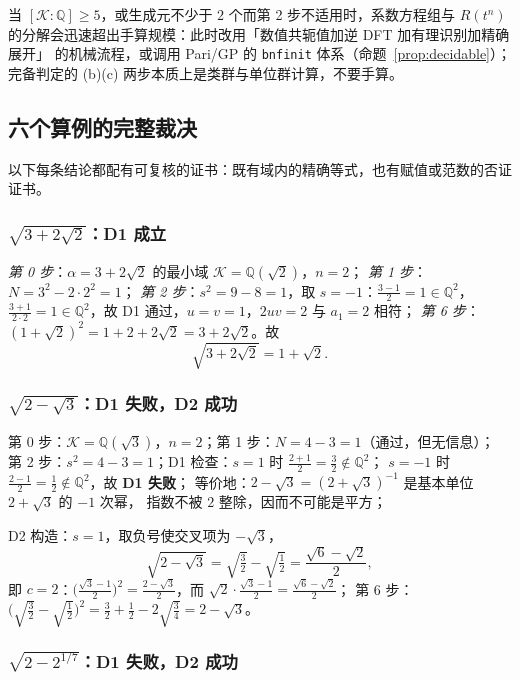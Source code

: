 \documentclass[UTF8,a4paper,11pt]{ctexart}
\begin{document}
当 $[\mathscr{K}:\mathbb{Q}]\ge5$，或生成元不少于 $2$ 个而第 2 步不适用时，系数方程组与
$R(t^n)$ 的分解会迅速超出手算规模：此时改用「数值共轭值加逆 DFT 加有理识别加精确展开」
的机械流程，或调用 Pari/GP 的 \texttt{bnfinit} 体系（命题~\ref{prop:decidable}）；
完备判定的 (b)(c) 两步本质上是类群与单位群计算，不要手算。
\subsection{六个算例的完整裁决}
\label{sec:examples}

以下每条结论都配有可复核的证书：既有域内的精确等式，也有赋值或范数的否证证书。\par

\subsubsection{$\sqrt{3+2\sqrt2}$：D1 成立}
\label{ex:first}

\emph{第 0 步}：$\alpha=3+2\sqrt2$ 的最小域 $\mathscr{K}=\mathbb{Q}(\sqrt2)$，$n=2$；
\emph{第 1 步}：$N=3^2-2\cdot2^2=1$；
\emph{第 2 步}：$s^2=9-8=1$，取 $s=-1$：$\tfrac{3-1}2=1\in\mathbb{Q}^2$，
$\tfrac{3+1}{2\cdot2}=1\in\mathbb{Q}^2$，故 D1 通过，$u=v=1$，$2uv=2$ 与 $a_1=2$ 相符；
\emph{第 6 步}：$(1+\sqrt2)^2=1+2+2\sqrt2=3+2\sqrt2$。故
\[
\sqrt{3+2\sqrt2}=1+\sqrt2 .
\]

\subsubsection{$\sqrt{2-\sqrt3}$：D1 失败，D2 成功}
\label{ex:two-sqrt3}

第 0 步：$\mathscr{K}=\mathbb{Q}(\sqrt3)$，$n=2$；第 1 步：$N=4-3=1$（通过，但无信息）；
第 2 步：$s^2=4-3=1$；D1 检查：$s=1$ 时 $\tfrac{2+1}2=\tfrac32\notin\mathbb{Q}^2$；
$s=-1$ 时 $\tfrac{2-1}2=\tfrac12\notin\mathbb{Q}^2$，故 \textbf{D1 失败}；
等价地：$2-\sqrt3=(2+\sqrt3)^{-1}$ 是基本单位 $2+\sqrt3$ 的 $-1$ 次幂，
指数不被 $2$ 整除，因而不可能是平方；\par

D2 构造：$s=1$，取负号使交叉项为 $-\sqrt3$，
\[
\sqrt{2-\sqrt3}=\sqrt{\tfrac32}-\sqrt{\tfrac12}=\frac{\sqrt6-\sqrt2}{2},
\]
即 $c=2$：$\bigl(\tfrac{\sqrt3-1}{2}\bigr)^2=\tfrac{2-\sqrt3}{2}$，而
$\sqrt2\cdot\tfrac{\sqrt3-1}2=\tfrac{\sqrt6-\sqrt2}2$；
第 6 步：$\bigl(\sqrt{\tfrac32}-\sqrt{\tfrac12}\bigr)^2
  =\tfrac32+\tfrac12-2\sqrt{\tfrac34}=2-\sqrt3$。\par

\subsubsection{$\sqrt{2-2^{1/7}}$：D1 失败，D2 成功}
\label{ex:seventh}
\end{document}
